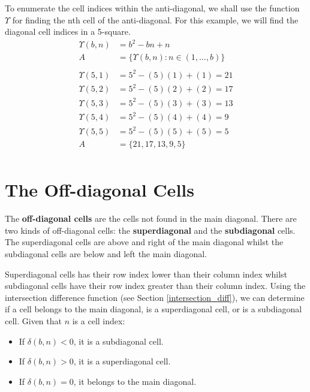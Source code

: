 \documentclass[letterpaper, twoside,12pt]{book}
\begin{document}
    To enumerate the cell indices within the anti-diagonal, we shall use the function $\Upsilon$ for finding the nth cell of the anti-diagonal. For this example, we will find the diagonal cell indices in a 5-square.
    \begin{equation}
        \begin{split}
            \Upsilon(b,n) &= b^2 - bn + n \\
            A &= \{ \Upsilon(b,n) : n \in (1, \dots, b) \} \\
            \\
            \Upsilon(5,1) &= 5^2 - (5)(1) + (1) = 21\\
            \Upsilon(5,2) &= 5^2 - (5)(2) + (2) = 17\\
            \Upsilon(5,3) &= 5^2 - (5)(3) + (3) = 13\\
            \Upsilon(5,4) &= 5^2 - (5)(4) + (4) = 9\\
            \Upsilon(5,5) &= 5^2 - (5)(5) + (5) = 5\\
            A &= \{ 21, 17, 13, 9, 5 \} \\
        \end{split}
    \end{equation}


    \section{The Off-diagonal Cells} \label{offdiagonal_cells}
    The \textbf{off-diagonal cells} are the cells not found in the main diagonal. There are two kinds of off-diagonal cells: the \textbf{superdiagonal} and the \textbf{subdiagonal} cells. The superdiagonal cells are above and right of the main diagonal whilst the subdiagonal cells are below and left the main diagonal.

    Superdiagonal cells has their row index lower than their column index whilst subdiagonal cells have their row index greater than their column index. Using the intersection difference function (see Section \ref{intersection_diff}), we can determine if a cell belongs to the main diagonal, is a superdiagonal cell, or is a subdiagonal cell. Given that $n$ is a cell index:
    \begin{itemize}
        \item If $\delta(b,n) < 0$, it is a subdiagonal cell.
        \item If $\delta(b,n) > 0$, it is a superdiagonal cell.
        \item If $\delta(b,n) = 0$, it belongs to the main diagonal.
    \end{itemize}
\end{document}
